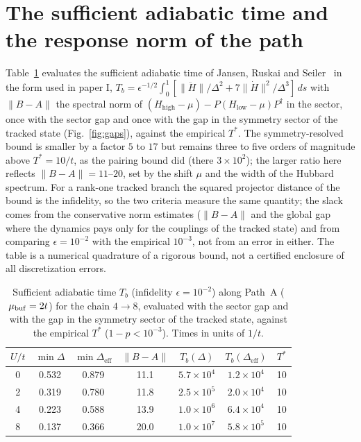 \documentclass[a4paper,11pt,noarxiv]{quantumarticle}
\newcommand{\Hlow}{H_{\mathrm{low}}}
\newcommand{\Hhigh}{H_{\mathrm{high}}}
\newcommand{\Deff}{\Delta_{\mathrm{eff}}}
\begin{document}
\section{The sufficient adiabatic time and the response norm of the path}
\label{sm:bound}
Table~\ref{tab:bound} evaluates the sufficient adiabatic time of Jansen,
Ruskai and Seiler~\cite{Jansen2007} in the form used in paper I,
$T_b=\epsilon^{-1/2}\int_0^1[\|\ddot H\|/\Delta^2+7\|\dot H\|^2/\Delta^3]\,ds$
with $\|B-A\|$ the spectral norm of $(\Hhigh-\mu)-P(\Hlow-\mu)P^\dagger$ in the
sector,
once with the sector gap and once with the gap in the symmetry sector of the
tracked state (Fig.~\ref{fig:gaps}), against the empirical $T^*$.  The
symmetry-resolved bound is smaller by a factor $5$ to $17$ but remains three
to five orders of magnitude above $T^*=10/t$, as the pairing bound did
(there $3\times10^2$); the larger ratio here reflects $\|B-A\|=11$--$20$,
set by the shift $\mu$ and the width of the Hubbard spectrum.  For a
rank-one tracked branch the squared projector distance of the bound is the
infidelity, so the two criteria measure the same quantity; the slack comes
from the conservative norm estimates ($\|B-A\|$ and the global gap where
the dynamics pays only for the couplings of the tracked state) and from
comparing $\epsilon=10^{-2}$ with the empirical $10^{-3}$, not from an error
in either.  The table is a numerical quadrature of a rigorous bound, not a
certified enclosure of all discretization errors.

\begin{table}[t]
  \caption{Sufficient adiabatic time $T_b$ (infidelity $\epsilon=10^{-2}$)
  along Path~A ($\mu_{\rm buf}=2t$) for the chain $4\to8$, evaluated with the
  sector gap and with the gap in the symmetry sector of the tracked state,
  against the empirical $T^*$ ($1-p<10^{-3}$).  Times in units of $1/t$.}
  \label{tab:bound}
  \centering\scriptsize
  \begin{tabular}{ccccccc}
  \toprule
  $U/t$ & $\min\Delta$ & $\min\Deff$ & $\|B-A\|$ & $T_b(\Delta)$ & $T_b(\Deff)$ & $T^*$\\
  \midrule
  0 & 0.532 & 0.879 & 11.1 & $5.7\times10^{4}$ & $1.2\times10^{4}$ & 10\\
  2 & 0.319 & 0.780 & 11.8 & $2.5\times10^{5}$ & $2.0\times10^{4}$ & 10\\
  4 & 0.223 & 0.588 & 13.9 & $1.0\times10^{6}$ & $6.4\times10^{4}$ & 10\\
  8 & 0.137 & 0.366 & 20.0 & $1.0\times10^{7}$ & $5.8\times10^{5}$ & 10\\
  \bottomrule
  \end{tabular}
\end{table}
\end{document}
